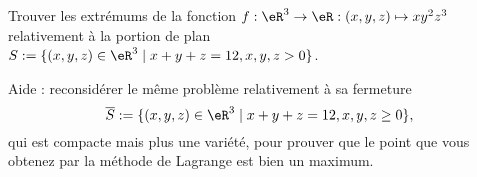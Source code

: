 
\begin{exercice}\label{exoVariete0003}

Trouver les extrémums de la fonction $f: \eR^3 \rightarrow \eR: (x,y,z) 
\mapsto xy^2z^3$ relativement à la portion de plan $S:= \{ (x,y,z) 
\in \eR^3 \mid x+y+z =12, x,y,z>0 \}$.

Aide : reconsidérer le même problème relativement à sa fermeture 
\[ 
\overline{S} := \{ (x,y,z) \in \eR^3 \mid x+y+z =12, x,y,z \geq 0 \},
\]
qui est compacte mais plus une variété, pour prouver que le point que vous obtenez par la méthode de Lagrange est bien un maximum.


\end{exercice}

